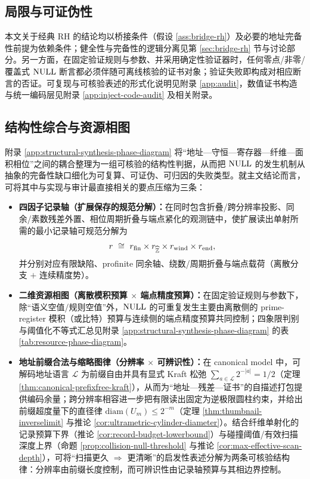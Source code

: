 \subsection{局限与可证伪性}
本文关于经典 RH 的结论均以桥接条件（假设 \ref{ass:bridge-rh}）及必要的地址完备性前提为依赖条件；健全性与完备性的逻辑分离见第 \ref{sec:bridge-rh} 节与讨论部分。另一方面，在固定验证规则与参数、并采用确定性验证器时，任何零点/非零/覆盖式 $\mathrm{NULL}$ 断言都必须伴随可离线核验的证书对象；验证失败即构成对相应断言的否证。可复现与可核验表述的形式化说明见附录 \ref{app:audit}，数值证书构造与统一编码层见附录 \ref{app:inject-code-audit} 及相关附录。

\subsection{结构性综合与资源相图}
附录 \ref{app:structural-synthesis-phase-diagram} 将“地址—守恒—寄存器—纤维—面积相位”之间的耦合整理为一组可核验的结构性判据，从而把 $\mathrm{NULL}$ 的发生机制从抽象的完备性缺口细化为可复算、可证伪、可归因的失败类型。就主文结论而言，可将其中与实现与审计最直接相关的要点压缩为三条：
\begin{itemize}
  \item \textbf{四因子记录轴（扩展保存的规范分解）：}在同时包含折叠/跨分辨率投影、同余/素数残差外置、相位周期折叠与端点紧化的观测链中，使扩展读出单射所需的最小记录轴可规范分解为
  $$
  r\ \cong\ r_{\mathrm{fin}}\times r_{\widehat{\mathbb{Z}}}\times r_{\mathrm{wind}}\times r_{\mathrm{end}},
  $$
  并分别对应有限缺陷、profinite 同余轴、绕数/周期折叠与端点载荷（离散分支 $+$ 连续精度势）。
  \item \textbf{二维资源相图（离散模积预算 $\times$ 端点精度预算）：}在固定验证规则与参数下，除“语义空值/规则空值”外，$\mathrm{NULL}$ 的可重复发生主要由离散侧的 prime-register 模积（或比特）预算与连续侧的端点精度预算共同控制；四象限判别与阈值化不等式汇总见附录 \ref{app:structural-synthesis-phase-diagram} 的表 \ref{tab:resource-phase-diagram}。
  \item \textbf{地址前缀合法与缩略图律（分辨率 $\times$ 可辨识性）：}在 canonical model 中，可解码地址语言 $\mathcal{L}$ 为前缀自由并具有显式 Kraft 松弛 $\sum_{a\in\mathcal{L}}2^{-|a|}=1/2$（定理 \ref{thm:canonical-prefixfree-kraft}），从而为“地址—残差—证书”的自描述打包提供编码余量；跨分辨率相容进一步把有限读出固定为逆极限圆柱约束，并给出前缀超度量下的直径律 $\mathrm{diam}(U_m)\le 2^{-m}$（定理 \ref{thm:thumbnail-inverselimit} 与推论 \ref{cor:ultrametric-cylinder-diameter}）。结合纤维单射化的记录预算下界（推论 \ref{cor:record-budget-lowerbound}）与碰撞阈值/有效扫描深度上界（命题 \ref{prop:collision-null-threshold} 与推论 \ref{cor:max-effective-scan-depth}），可将“扫描更久 $\Rightarrow$ 更清晰”的启发性表述分解为两条可核验结构律：分辨率由前缀长度控制，而可辨识性由记录轴预算与其相边界控制。
\end{itemize}


